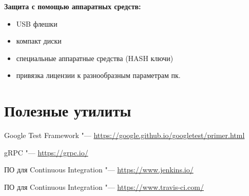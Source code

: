 \documentclass[bachelor, och, pract]{SCWorks}
\theoremstyle{remark}
\begin{document}
    \textbf{Защита с помощью аппаратных средств:}
    
    \begin{itemize}[label=$\bullet$]
        \item USB флешки
        \item компакт диски
        \item специальные аппаратные средства (HASH ключи)
        \item привязка лицензии к разнообразным параметрам пк.
    \end{itemize}


    \section{Полезные утилиты}

    Google Test Framework "--- \href{https://google.github.io/googletest/primer.html}{https://google.github.io/googletest/primer.html}
    
    gRPC "--- \href{https://grpc.io/}{https://grpc.io/}

    ПО для Continuous Integration "--- \href{https://www.jenkins.io/}{https://www.jenkins.io/}
    
    ПО для Continuous Integration "--- \href{https://www.travis-ci.com/}{https://www.travis-ci.com/}
\end{document}
